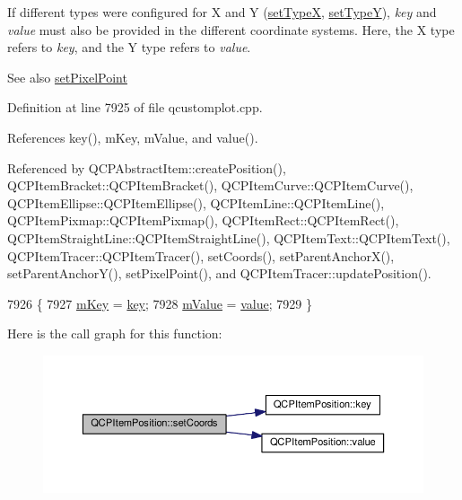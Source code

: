 If different types were configured for X and Y (\hyperlink{class_q_c_p_item_position_a2113b2351d6d00457fb3559a4e20c3ea}{set\+Type\+X}, \hyperlink{class_q_c_p_item_position_ac2a454aa5a54c1615c50686601ec4510}{set\+Type\+Y}), {\itshape key} and {\itshape value} must also be provided in the different coordinate systems. Here, the X type refers to {\itshape key}, and the Y type refers to {\itshape value}.

\begin{DoxySeeAlso}{See also}
\hyperlink{class_q_c_p_item_position_ab404e56d9ac2ac2df0382c57933a71ef}{set\+Pixel\+Point} 
\end{DoxySeeAlso}


Definition at line 7925 of file qcustomplot.\+cpp.



References key(), m\+Key, m\+Value, and value().



Referenced by Q\+C\+P\+Abstract\+Item\+::create\+Position(), Q\+C\+P\+Item\+Bracket\+::\+Q\+C\+P\+Item\+Bracket(), Q\+C\+P\+Item\+Curve\+::\+Q\+C\+P\+Item\+Curve(), Q\+C\+P\+Item\+Ellipse\+::\+Q\+C\+P\+Item\+Ellipse(), Q\+C\+P\+Item\+Line\+::\+Q\+C\+P\+Item\+Line(), Q\+C\+P\+Item\+Pixmap\+::\+Q\+C\+P\+Item\+Pixmap(), Q\+C\+P\+Item\+Rect\+::\+Q\+C\+P\+Item\+Rect(), Q\+C\+P\+Item\+Straight\+Line\+::\+Q\+C\+P\+Item\+Straight\+Line(), Q\+C\+P\+Item\+Text\+::\+Q\+C\+P\+Item\+Text(), Q\+C\+P\+Item\+Tracer\+::\+Q\+C\+P\+Item\+Tracer(), set\+Coords(), set\+Parent\+Anchor\+X(), set\+Parent\+Anchor\+Y(), set\+Pixel\+Point(), and Q\+C\+P\+Item\+Tracer\+::update\+Position().


\begin{DoxyCode}
7926 \{
7927   \hyperlink{class_q_c_p_item_position_a4ff3931ad115603dfb4c7000b24bb415}{mKey} = \hyperlink{class_q_c_p_item_position_ac3cb2bddf5f89e5181830be30b93d090}{key};
7928   \hyperlink{class_q_c_p_item_position_a67bf5df69f587d53731724a7d61c6c3f}{mValue} = \hyperlink{class_q_c_p_item_position_a6817f7356d3a2b63e8446c6b6106dae1}{value};
7929 \}
\end{DoxyCode}


Here is the call graph for this function\+:\nopagebreak
\begin{figure}[H]
\begin{center}
\leavevmode
\includegraphics[width=350pt]{class_q_c_p_item_position_aa988ba4e87ab684c9021017dcaba945f_cgraph}
\end{center}
\end{figure}




